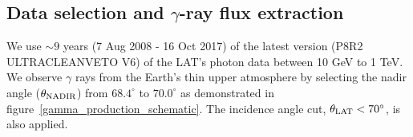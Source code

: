 \subsection{Data selection and $\gamma$-ray flux extraction}

We use $\sim9$ years (7 Aug 2008 - 16 Oct 2017) of the latest version
(P8R2 ULTRACLEANVETO V6) of the LAT's photon data between 10 GeV to 1 TeV.
We observe $\gamma$ rays from the Earth's thin upper atmosphere by selecting the
nadir angle ($\theta_{\rm NADIR}$) from $68.4^\circ$ to $70.0^\circ$ \cite{previouswork} as
demonstrated in figure~\ref{gamma_production_schematic}. The incidence angle cut,
$\theta_{\rm LAT}<70^\circ$, is also applied.




